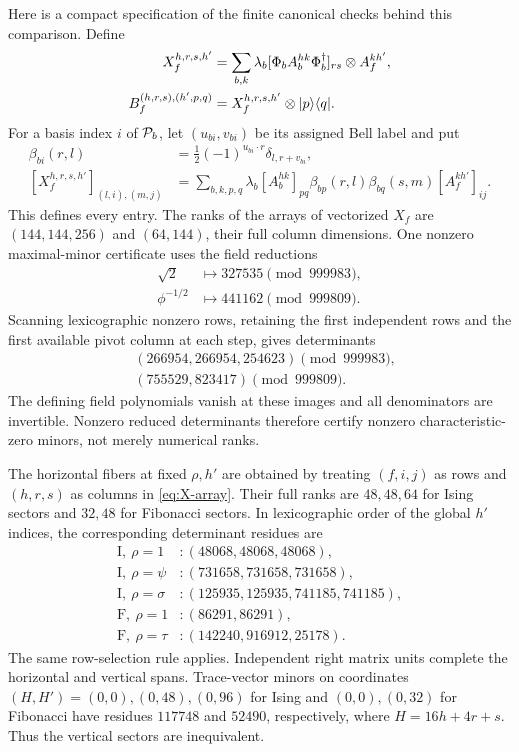 Here is a compact specification of the finite canonical checks
behind this comparison. Define
\begin{align}
	X_f^{h,r,s,h'}
	 & =\sum_{b,k}\lambda_b
	              [\Phi_bA_b^{hk}\Phi_b^\dagger]_{rs}\otimes A_f^{kh'}, \\
	B_f^{(h,r,s),(h',p,q)}
	 & =X_f^{h,r,s,h'}\otimes\lvert p\rangle\langle q\rvert.
\end{align}
For a basis index $i$ of $\mathcal{P}_b$, let $(u_{bi},v_{bi})$ be its
assigned Bell label and put
\begin{align}
	\beta_{bi}(r,l)
	 & =\tfrac12(-1)^{u_{bi}\cdot r}\delta_{l,r+v_{bi}}, \\
	[X_f^{h,r,s,h'}]_{(l,i),(m,j)}
	 & =\sum_{b,k,p,q}\lambda_b[A_b^{hk}]_{pq}
	\beta_{bp}(r,l)\beta_{bq}(s,m)[A_f^{kh'}]_{ij}.
	\label{eq:X-array}
\end{align}
This defines every entry. The ranks of the arrays of vectorized
$X_f$ are $(144,144,256)$ and $(64,144)$, their full column
dimensions. One nonzero maximal-minor certificate uses the field
reductions
\begin{align}
	\sqrt2      & \longmapsto327535\pmod{999983}, \\
	\phi^{-1/2} & \longmapsto441162\pmod{999809}.
\end{align}
Scanning lexicographic nonzero rows, retaining the first independent
rows and the first available pivot column at each step, gives
determinants
\begin{align}
	 & (266954,266954,254623)\pmod{999983}, \\
	 & (755529,823417)\pmod{999809}.
\end{align}
The defining field polynomials vanish at these images and all
denominators are invertible. Nonzero reduced determinants therefore
certify nonzero characteristic-zero minors, not merely numerical
ranks.

The horizontal fibers at fixed $\rho,h'$ are obtained by treating
$(f,i,j)$ as rows and $(h,r,s)$ as columns in \cref{eq:X-array}.
Their full ranks are $48,48,64$ for Ising sectors and $32,48$
for Fibonacci sectors. In lexicographic order of the global $h'$
indices, the corresponding determinant residues are
\begin{align}
	\mathrm I,\ \rho=1      & : (48068,48068,48068),\nonumber    \\
	\mathrm I,\ \rho=\psi   & : (731658,731658,731658),\nonumber \\
	\mathrm I,\ \rho=\sigma & : (125935,125935,741185,741185),   \\
	\mathrm F,\ \rho=1      & : (86291,86291),\nonumber          \\
	\mathrm F,\ \rho=\tau   & : (142240,916912,25178).
\end{align}
The same row-selection rule applies. Independent right matrix units
complete the horizontal and vertical spans. Trace-vector minors on
coordinates $(H,H')=(0,0),(0,48),(0,96)$ for Ising and
$(0,0),(0,32)$ for Fibonacci have residues $117748$ and $52490$,
respectively, where $H=16h+4r+s$. Thus the vertical sectors are
inequivalent.

